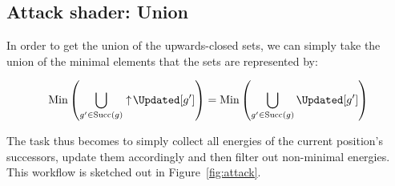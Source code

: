 \subsection{Attack shader: Union}\label{subsec:attack_shader}

In order to get the union of the upwards-closed sets,
we can simply take the union of the minimal elements
that the sets are represented by:

\[\mathrm{Min} \left( \bigcup_{g' \in \mathrm{Succ}(g)} \upclosed \Updated[g'] \right) =
  \mathrm{Min} \left( \bigcup_{g' \in \mathrm{Succ}(g)}           \Updated[g'] \right)\]

The task thus becomes to simply
collect all energies of the current position's successors,
update them accordingly
and then filter out non-minimal energies.
This workflow is sketched out in Figure~\ref{fig:attack}.


